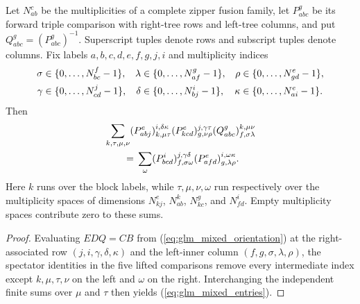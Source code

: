 \begin{lemma}
    \leanok
    \label{thm:glm_mixed_entries}
    Let $N_{ab}^{c}$ be the multiplicities of a complete zipper fusion
    family, let $P_{abc}^{g}$ be its forward triple comparison with
    right-tree rows and left-tree columns, and put
    $Q_{abc}^{g}=(P_{abc}^{g})^{-1}$. Superscript tuples denote rows and
    subscript tuples denote columns. Fix labels $a,b,c,d,e,f,g,j,i$ and
    multiplicity indices
    \begin{align}
        \sigma  & \in\{0,\ldots,N_{bc}^{f}-1\},       &
        \lambda & \in\{0,\ldots,N_{af}^{g}-1\},       &
        \rho    & \in\{0,\ldots,N_{gd}^{e}-1\},\notag   \\
        \gamma  & \in\{0,\ldots,N_{cd}^{j}-1\},       &
        \delta  & \in\{0,\ldots,N_{bj}^{i}-1\},       &
        \kappa  & \in\{0,\ldots,N_{ai}^{e}-1\}.\notag
    \end{align}
    Then
    \begin{align}
         & \sum_{k,\tau,\mu,\nu}
        (P_{abj}^{e})_{k,\mu\tau}^{i,\delta\kappa}
        (P_{kcd}^{e})_{g,\nu\rho}^{j,\gamma\tau}
        (Q_{abc}^{g})_{f,\sigma\lambda}^{k,\mu\nu}\notag \\
         & \qquad={}
        \sum_{\omega}
        (P_{bcd}^{i})_{f,\sigma\omega}^{j,\gamma\delta}
        (P_{afd}^{e})_{g,\lambda\rho}^{i,\omega\kappa}.
        \label{eq:glm_mixed_entries}
    \end{align}
    Here $k$ runs over the block labels, while $\tau,\mu,\nu,\omega$
    run respectively over the multiplicity spaces of dimensions
    $N_{kj}^{e}$, $N_{ab}^{k}$, $N_{kc}^{g}$, and $N_{fd}^{i}$.
    Empty multiplicity spaces contribute zero to these sums.
\end{lemma}
\begin{proof}
    \leanok
    Evaluating $EDQ=CB$ from (\ref{eq:glm_mixed_orientation}) at the
    right-associated row $(j,i,\gamma,\delta,\kappa)$ and the left-inner
    column $(f,g,\sigma,\lambda,\rho)$, the spectator identities in
    the five lifted comparisons remove every intermediate index except
    $k,\mu,\tau,\nu$ on the left and $\omega$ on the right. Interchanging
    the independent finite sums over $\mu$ and $\tau$ then yields
    (\ref{eq:glm_mixed_entries}).
\end{proof}

